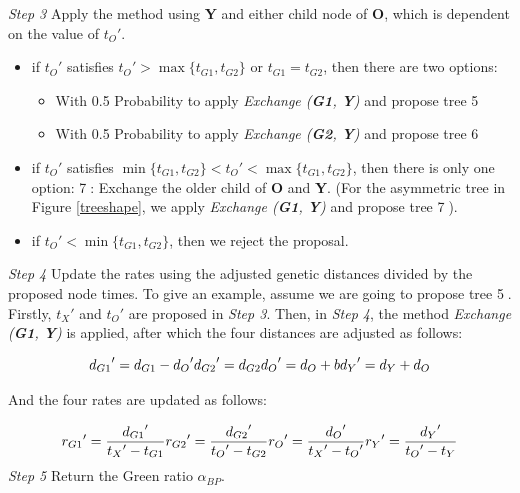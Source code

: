 \documentclass{bmcart}
\begin{document}
\emph{Step 3} Apply the method using \textbf{Y} and either child node of \textbf{O}, which is dependent on the value of ${t_O}'$.
\begin{itemize}
\item if ${t_O}'$ satisfies ${t_O}' > \max \{ {t_{G1}},{t_{G2}}\} $ or ${t_{G1}} = {t_{G2}}$, then there are two options:

  \begin{itemize}
    \item With 0.5 Probability to apply \textit{Exchange (\textbf{G1}, \textbf{Y})} and propose tree \textcircled5

    \item With 0.5 Probability to apply \textit{Exchange (\textbf{G2}, \textbf{Y})} and propose tree \textcircled6
  \end{itemize}
  
\item if ${t_O}'$ satisfies $\min \{ {t_{G1}},{t_{G2}}\}  < {t_O}' < \max \{ {t_{G1}},{t_{G2}}\} $, then there is only one option:
\textcircled7: Exchange the older child of \textbf{O} and \textbf{Y}.
 (For the asymmetric tree in Figure \ref{treeshape}, we apply \textit{Exchange (\textbf{G1}, \textbf{Y})} and propose tree \textcircled7).
 
 \item if ${t_O}' < \min \{ {t_{G1}},{t_{G2}}\}$, then we reject the proposal.
\end{itemize}

\emph{Step 4}  Update the rates using the adjusted genetic distances divided by the proposed node times. To give an example, assume we are going to propose tree \textcircled5. Firstly, ${t_X}'$ and ${t_O}'$ are proposed in \emph{Step 3}.  Then, in \emph{Step 4}, the method \textit{Exchange (\textbf{G1}, \textbf{Y})} is applied, after which the four distances are adjusted as follows:

\begin{equation}\label{example2.1}
{d_{G1}}' = {d_{G1}} - {d_O}'  \\
{d_{G2}}' = {d_{G2}}  \\
{d_O}' = {d_O} + b  \\
{d_Y}' = {d_Y} + {d_O}
\end{equation}

And the four rates are updated as follows:

\begin{equation}\label{example2.2}
{r_{G1}}' = \frac{{{d_{G1}}'}}{{{t_X}' - {t_{G1}}}} \\
{r_{G2}}' = \frac{{{d_{G2}}'}}{{{t_O}' - {t_{G2}}}} \\
{r_O}' = \frac{{{d_O}'}}{{{t_X}' - {t_O}'}} \\
{r_Y}' = \frac{{{d_Y}'}}{{{t_O}' - {t_Y}}}
\end{equation}
\emph{Step 5} Return the Green ratio ${\alpha_{BP}}$.
\end{document}
